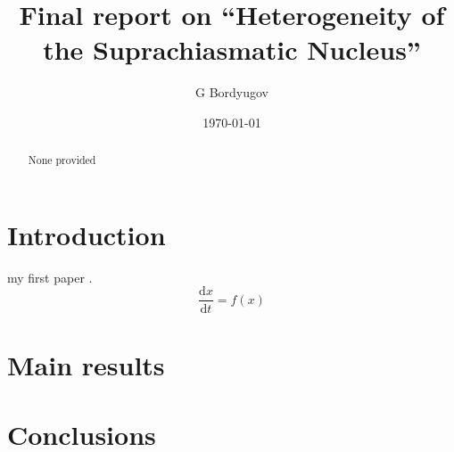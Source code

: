 \documentclass[a4paper]{article}
\title{Final report on ``Heterogeneity of the Suprachiasmatic
Nucleus''}
\author{G Bordyugov \mailhref{grigory.bordyugov@gmail.com}}
\date{\today}
\newcommand{\dd}{\text{d}}
\newcommand{\of}[1]{\left( {#1} \right)}
\newcommand{\fracd}[2]{\frac{\dd{}{#1}}{\dd{}{#2}}}
\begin{document}
\maketitle

\begin{abstract}
  None provided
\end{abstract}

\tableofcontents

\section{Introduction}
my first paper
\cite{bordyugov2015tuning,schmal2015theoretical,schmal2017moran,myung2017choroid,kondoff2015modeling}.
\[
\fracd{x}{t} = f\of{x}
\]

\section{Main results}
\section{Conclusions}



\end{document}
